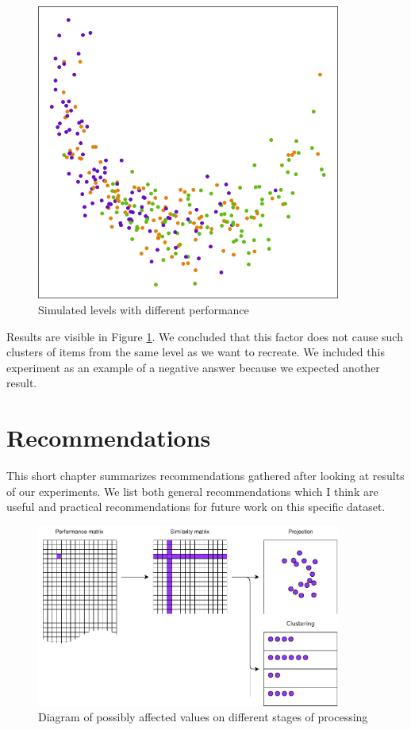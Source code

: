 \documentclass[
  digital, %
  table,   %
  nolof,     %
  nolot,     %
  nocover,
  color,
  final, %
]{fithesis3}
\begin{document}
\begin{figure}
  \includegraphics[width=10cm]{img/simulated_performance}
  \caption{Simulated levels with different performance}
  \label{fig:simulated_performance}
\end{figure}


Results are visible in Figure \ref{fig:simulated_performance}. We concluded that this factor does not cause such clusters of items from the same level as we want to recreate. We included this experiment as an example of a negative answer because we expected another result.


\chapter{Recommendations}\label{recommendations}


This short chapter summarizes recommendations gathered after looking at results of our experiments. We list both general recommendations which I think are useful and practical recommendations for future work on this specific dataset.


\begin{figure}
  \includegraphics[width=10cm]{img/affected_diagram}
  \caption{Diagram of possibly affected values on different stages of processing}
  \label{fig:affected_diagram}
\end{figure}
\end{document}
